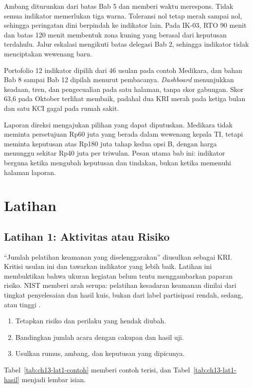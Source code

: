 Ambang diturunkan dari batas Bab 5 dan memberi waktu merespons. Tidak semua indikator memerlukan
tiga warna. Toleransi nol tetap merah sampai nol, sehingga peringatan dini berpindah ke indikator
lain. Pada IK-03, RTO 90 menit dan batas 120 menit membentuk zona kuning yang berasal dari keputusan
terdahulu. Jalur eskalasi mengikuti batas delegasi Bab 2, sehingga indikator tidak menciptakan
wewenang baru.

Portofolio 12 indikator dipilih dari 46 usulan pada contoh Medikara, dan bahan Bab 8 sampai Bab 12
dipilah menurut pembacanya. \textit{Dashboard} menunjukkan keadaan, tren, dan pengecualian pada satu
halaman, tanpa skor gabungan. Skor 63,6 pada Oktober terlihat membaik, padahal dua KRI merah pada
ketiga bulan dan satu KCI gagal pada rumah sakit.

Laporan direksi mengajukan pilihan yang dapat diputuskan. Medikara tidak meminta persetujuan Rp60
juta yang berada dalam wewenang kepala TI, tetapi meminta keputusan atas Rp180 juta tahap kedua opsi
B, dengan harga menunggu sekitar Rp40 juta per triwulan. Pesan utama bab ini: indikator berguna
ketika mengubah keputusan dan tindakan, bukan ketika memenuhi halaman laporan.

\section{Latihan}

\subsection*{Latihan 1: Aktivitas atau Risiko}

``Jumlah pelatihan keamanan yang diselenggarakan'' diusulkan sebagai KRI. Kritisi usulan ini dan
tawarkan indikator yang lebih baik. Latihan ini membuktikan bahwa ukuran kegiatan belum tentu
menggambarkan paparan risiko. NIST memberi arah serupa: pelatihan kesadaran keamanan dinilai dari
tingkat penyelesaian dan hasil kuis, bukan dari label partisipasi rendah, sedang, atau tinggi
\cite{c13-nist80055v1}.
\begin{enumerate}
  \item Tetapkan risiko dan perilaku yang hendak diubah.
  \item Bandingkan jumlah acara dengan cakupan dan hasil uji.
  \item Usulkan rumus, ambang, dan keputusan yang dipicunya.
\end{enumerate}

Tabel~\ref{tab:ch13-lat1-contoh} memberi contoh terisi, dan Tabel~\ref{tab:ch13-lat1-hasil} menjadi
lembar isian.

